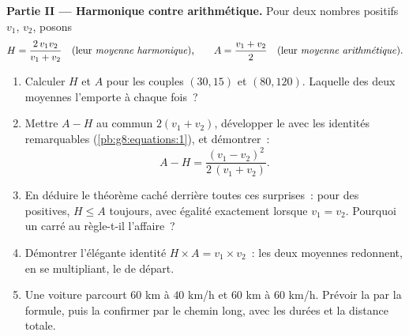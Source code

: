 \begin{problem}
\medskip
\noindent\textbf{Partie II --- Harmonique contre arithmétique.}
Pour deux nombres positifs $v_1$, $v_2$, posons
\[
H = \frac{2\, v_1 v_2}{v_1 + v_2}
\quad\text{(leur \emph{moyenne harmonique}),}
\qquad
A = \frac{v_1 + v_2}{2}
\quad\text{(leur \emph{moyenne arithmétique}).}
\]
\begin{enumerate}[resume]
  \item Calculer $H$ et $A$ pour les couples $(30, 15)$ et
        $(80, 120)$. Laquelle des deux moyennes l'emporte à chaque
        fois~?
  \item Mettre $A - H$ au  commun $2(v_1 + v_2)$,
        développer le  avec les identités remarquables
        (\cref{pb:g8:equations:1}), et démontrer~:
        \[
        A - H = \frac{(v_1 - v_2)^2}{2\,(v_1 + v_2)} .
        \]
  \item En déduire le théorème caché derrière toutes ces
        surprises~: pour des  positives, $H \leq A$
        toujours, avec égalité exactement lorsque $v_1 = v_2$.
        Pourquoi un carré au  règle-t-il l'affaire~?
  \item Démontrer l'élégante identité
        $H \times A = v_1 \times v_2$~: les deux moyennes
        redonnent, en se multipliant, le  de départ.
  \item Une voiture parcourt $60$ km à $40$ km/h et $60$ km à
        $60$ km/h. Prévoir la  par la formule, puis
        la confirmer par le chemin long, avec les durées et la
        distance totale.
\end{enumerate}


\end{problem}
